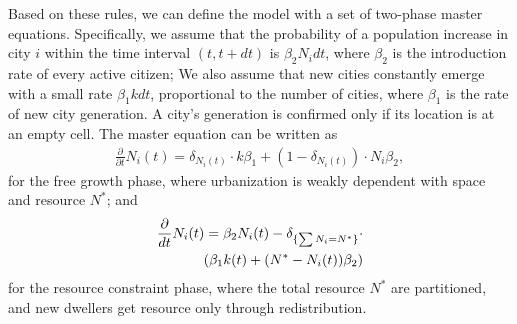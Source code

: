 \documentclass[reprint,unsortedaddress,amsmath,amssymb,aps,prl,showkeys]{revtex4-2}
\begin{document}
Based on these rules, we can define the model with a set of two-phase master equations. Specifically, we assume that the probability of a population increase in city $i$ within the time interval $(t,t+dt)$ is $\beta_2N_idt$, where $\beta_2$ is the introduction rate of every active citizen; We also assume that new cities constantly emerge with a small rate $\beta_1kdt$, proportional to the number of cities, where $\beta_1$ is the rate of new city generation. A city's generation is confirmed only if its location is at an empty cell. The master equation can be written as \begin{align}\frac{\partial}{\partial t}N_i(t) =  \delta_{N_i(t)}\cdot k\beta_1+ (1-\delta_{N_i(t)})\cdot N_i\beta_2, \end{align} for the free growth phase, where urbanization is weakly dependent with space and resource $N^*$;
and \begin{align}
	\frac{\partial}{dt} N_i(t) = \beta_2 N_i(t) -\delta_{\{\sum N_i = N^*\}}\cdot\notag \\ \left(\beta_1k(t) + (N^*-N_i(t))\beta_2 \right)
\end{align}
for the resource constraint phase, where the total resource $N^*$ are partitioned, and new dwellers get resource only through redistribution. 
\end{document}
